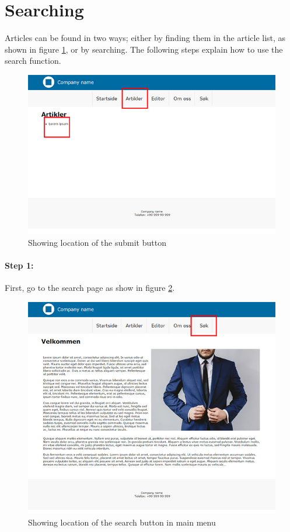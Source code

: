 \section{Searching}
Articles can be found in two ways; either by finding them in the article list, as shown in figure \ref{fig:manual6}, or by searching. The following steps explain how to use the search function.

\begin{figure}[H]
    \centering
    \includegraphics[scale=0.70]{fig/userManual/6}
    \caption{Showing location of the submit button}
    \label{fig:manual6}
\end{figure}

\paragraph{Step 1:} First, go to the search page as show in figure \ref{fig:manual7}.

\begin{figure}[H]
    \centering
    \includegraphics[scale=0.70]{fig/userManual/7}
    \caption{Showing location of the search button in main menu}
    \label{fig:manual7}
\end{figure}


